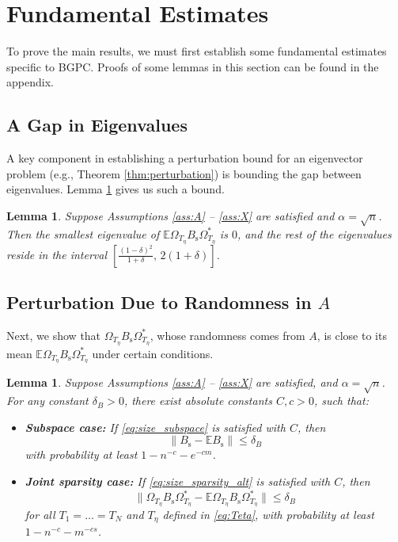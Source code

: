 \documentclass[11pt,journal]{IEEEtran}
\newcommand{\bbE}{\mathbb{E}}
\newcommand{\rms}{\mathrm{s}}
\newcommand{\norm}[1]{\|{#1}\|}
\newtheorem{lemma}[theorem]{Lemma}
\begin{document}
\section{Fundamental Estimates} \label{sec:fun_est}
To prove the main results, we must first establish some fundamental estimates specific to BGPC. Proofs of some lemmas in this section can be found in the appendix.


\subsection{A Gap in Eigenvalues} \label{sec:gap}


A key component in establishing a perturbation bound for an eigenvector problem (e.g., Theorem \ref{thm:perturbation}) is bounding the gap between eigenvalues. Lemma \ref{lem:expB} gives us such a bound.

\begin{lemma} \label{lem:expB}
Suppose Assumptions \ref{ass:A} -- \ref{ass:X} are satisfied and $\alpha =\sqrt{n}$. Then the smallest eigenvalue of $\bbE \Omega_{T_\eta} B_\rms \Omega_{T_\eta}^*$ is $0$, and the rest of the eigenvalues reside in the interval $[\frac{(1-\delta)^2}{1+\delta},\, 2(1+\delta)]$.
\end{lemma}



\subsection{Perturbation Due to Randomness in $A$} \label{sec:concentration}


Next, we show that $\Omega_{T_\eta} B_\rms \Omega_{T_\eta}^*$, whose randomness comes from $A$, is close to its mean $\bbE \Omega_{T_\eta} B_\rms \Omega_{T_\eta}^*$ under certain conditions. 

\begin{lemma} \label{lem:Bs}
Suppose Assumptions \ref{ass:A} -- \ref{ass:X} are satisfied, and $\alpha =\sqrt{n}$.
For any constant $\delta_B > 0$, there exist absolute constants $C,c>0$, such that:
\begin{itemize}
	\item \textbf{Subspace case:} If \eqref{eq:size_subspace} is satisfied with $C$, then
\[
\norm{B_\rms -\bbE B_\rms } \leq \delta_B
\]
with probability at least $1 - n^{-c} -e^{-cm}$.

	\item \textbf{Joint sparsity case:} If \eqref{eq:size_sparsity_alt} is satisfied with $C$, then
\[
\norm{\Omega_{T_\eta} B_\rms \Omega_{T_\eta}^* -\bbE \Omega_{T_\eta} B_\rms \Omega_{T_\eta}^*} \leq \delta_B
\]
for all $T_1=\dots = T_N$ and $T_\eta$ defined in \eqref{eq:Teta}, with probability at least $1 - n^{-c} -m^{-cs}$.
\end{itemize}
\end{lemma}
\end{document}
